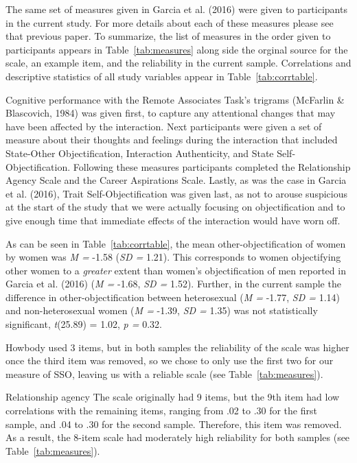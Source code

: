 \documentclass[man]{apa6}
\begin{document}
The same set of measures given in Garcia et al. (2016) were given to
participants in the current study. For more details about each of these
measures please see that previous paper. To summarize, the list of
measures in the order given to participants appears in
Table~\ref{tab:measures} along side the orginal source for the scale, an
example item, and the reliability in the current sample. Correlations
and descriptive statistics of all study variables appear in
Table~\ref{tab:corrtable}.

Cognitive performance with the Remote Associates Task's trigrams
(McFarlin \& Blascovich, 1984) was given first, to capture any
attentional changes that may have been affected by the interaction. Next
participants were given a set of measure about their thoughts and
feelings during the interaction that included State-Other
Objectification, Interaction Authenticity, and State
Self-Objectification. Following these measures participants completed
the Relationship Agency Scale and the Career Aspirations Scale. Lastly,
as was the case in Garcia et al. (2016), Trait Self-Objectification was
given last, as not to arouse suspicious at the start of the study that
we were actually focusing on objectification and to give enough time
that immediate effects of the interaction would have worn off.

As can be seen in Table~\ref{tab:corrtable}, the mean
other-objectification of women by women was \emph{M =} -1.58 (\emph{SD
=} 1.21). This corresponds to women objectifying other women to a
\emph{greater} extent than women's objectification of men reported in
Garcia et al. (2016) (\emph{M =} -1.68, \emph{SD =} 1.52). Further, in
the current sample the difference in other-objectification between
heterosexual (\emph{M =} -1.77, \emph{SD =} 1.14) and non-heterosexual
women (\emph{M =} -1.39, \emph{SD =} 1.35) was not statistically
significant, \emph{t}(25.89) = 1.02, \emph{p =} 0.32.

Howbody used 3 items, but in both samples the reliability of the scale
was higher once the third item was removed, so we chose to only use the
first two for our measure of SSO, leaving us with a reliable scale (see
Table~\ref{tab:measures}).

Relationship agency The scale originally had 9 items, but the 9th item
had low correlations with the remaining items, ranging from .02 to .30
for the first sample, and .04 to .30 for the second sample. Therefore,
this item was removed. As a result, the 8-item scale had moderately high
reliability for both samples (see Table~\ref{tab:measures}).
\end{document}
